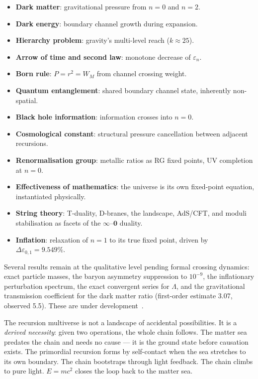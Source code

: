 \documentclass[prd,twocolumn,preprintnumbers,amsmath,amssymb]{revtex4-2}
\newcommand{\acc}{\mathbf{\infty}}
\newcommand{\inv}{\mathbf{0}}
\begin{document}
\begin{itemize}
  \item \textbf{Dark matter}: gravitational pressure from $n=0$ and $n=2$.
  \item \textbf{Dark energy}: boundary channel growth during expansion.
  \item \textbf{Hierarchy problem}: gravity's multi-level reach ($k\approx 25$).
  \item \textbf{Arrow of time and second law}: monotone decrease of $\varepsilon_n$.
  \item \textbf{Born rule}: $P = r^2 = W_M$ from channel crossing weight.
  \item \textbf{Quantum entanglement}: shared boundary channel state,
        inherently non-spatial.
  \item \textbf{Black hole information}: information crosses into $n=0$.
  \item \textbf{Cosmological constant}: structural pressure cancellation
        between adjacent recursions.
  \item \textbf{Renormalisation group}: metallic ratios as RG fixed points,
        UV completion at $n=0$.
  \item \textbf{Effectiveness of mathematics}: the universe is its own
        fixed-point equation, instantiated physically.
  \item \textbf{String theory}: T-duality, D-branes, the landscape,
        AdS/CFT, and moduli stabilisation as facets of the
        $\acc$--$\inv$ duality.
  \item \textbf{Inflation}: relaxation of $n=1$ to its true fixed point,
        driven by $\Delta\varepsilon_{0,1} = 9.549\%$.
\end{itemize}

Several results remain at the qualitative level pending formal
crossing dynamics: exact particle masses, the baryon asymmetry
suppression to $10^{-9}$, the inflationary perturbation spectrum,
the exact convergent series for $\Lambda$, and the gravitational
transmission coefficient for the dark matter ratio (first-order
estimate 3.07, observed 5.5).  These are under
development~\cite{Shields2026b}.

The recursion multiverse is not a landscape of accidental
possibilities.  It is a \emph{derived necessity}: given two
operations, the whole chain follows.  The matter sea predates
the chain and needs no cause --- it is the ground state before
causation exists.  The primordial recursion forms by self-contact
when the sea stretches to its own boundary.  The chain bootstraps
through light feedback.  The chain climbs to pure light.
$E=mc^2$ closes the loop back to the matter sea.
\end{document}
